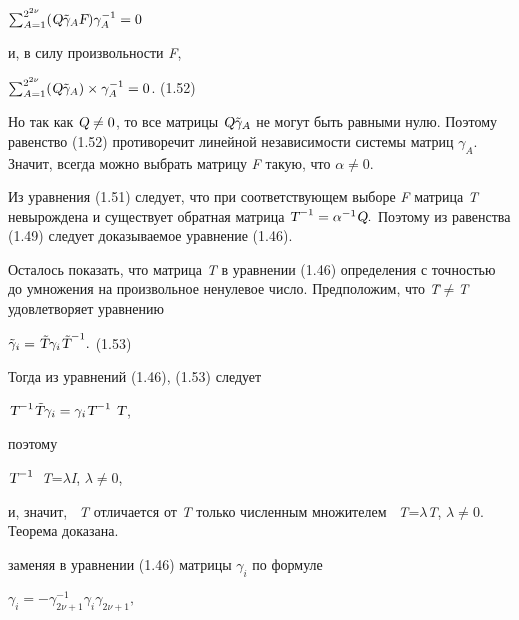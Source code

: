 \documentclass{article}
\begin{document}
{\begin{center}
$\sum_{A=1}^{2^{2\nu}}(\textsl{Q}\tilde\gamma_{A}\textsl{F})\gamma_{A}^{-1}=0$\par
\end{center}
и, в силу произвольности \textsl{F},\par
\begin{center}
$\sum_{A=1}^{2^{2\nu}}(\textsl{Q}\tilde\gamma_{A})\times\gamma^{-1}_{A}=0$.        (1.52)\par
\end{center}
Но так как $\textsl{Q}\ne0$, то все матрицы $\textsl{Q}\tilde\gamma_{A}$ не могут быть равными нулю. Поэтому равенство (1.52) противоречит линейной независимости системы матриц $\gamma_{A}$. Значит, всегда можно выбрать матрицу \textsl{F} такую, что $\alpha\ne0$.\par
Из уравнения (1.51) следует, что при соответствующем выборе \textsl{F} матрица \textsl{T} невырождена и существует обратная матрица $\textsl{T}^{-1}=\alpha^{-1}\textsl{Q}.$ Поэтому из равенства (1.49) следует доказываемое уравнение (1.46).\par
Осталось показать, что матрица \textsl{T} в уравнении (1.46) определения с точностью до умножения на произвольное ненулевое число. Предположим, что \textsl{\~T}$\ne$\textsl{T} удовлетворяет уравнению\par
\begin{center}
$\tilde\gamma_{i}=\textsl{\~T}\gamma_{i}\textsl{\~T}^{-1}.$ (1.53)\par
\end{center}
Тогда из уравнений (1.46), (1.53) следует\par
\begin{center}
$\textsl{T}^{-1}\textsl{\~T}\gamma_{i}=\gamma_{i}\textsl{T}^{-1}\textsl{~T}$,\par
\end{center}
поэтому\par
\begin{center}
$\textsl{T}^{-1}$\textsl{~T}=$\lambda$\textsl{I}, $\lambda\ne0$,\par
\end{center}
и, значит, \textsl{~T} отличается от \textsl{T} только численным множителем \textsl{~T}=$\lambda$\textsl{T}, $\lambda\ne0$. Теорема доказана.\par
заменяя в уравнении (1.46) матрицы $\gamma_{i}$ по формуле \par
\begin{center}
$\gamma_{i}=-\gamma^{-1}_{2\nu+1}\gamma_{i}\gamma_{2\nu+1},$\par
\end{center}
}
\end{document}
